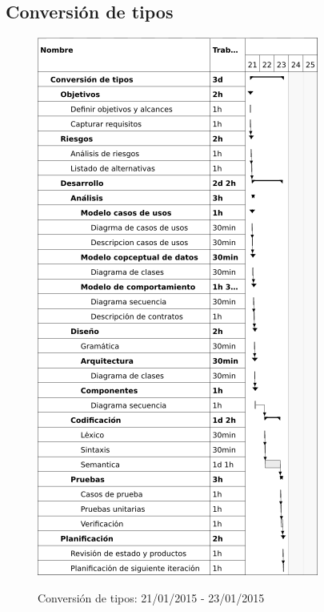 \subsection{Conversión de tipos}
\begin{center}
\begin{figure}[H]
\centering
\includegraphics[scale=1]{planning/10-conversion-tipos.png} \\
\caption{Conversión de tipos: 21/01/2015 - 23/01/2015 }
\end{figure}
\end{center}


